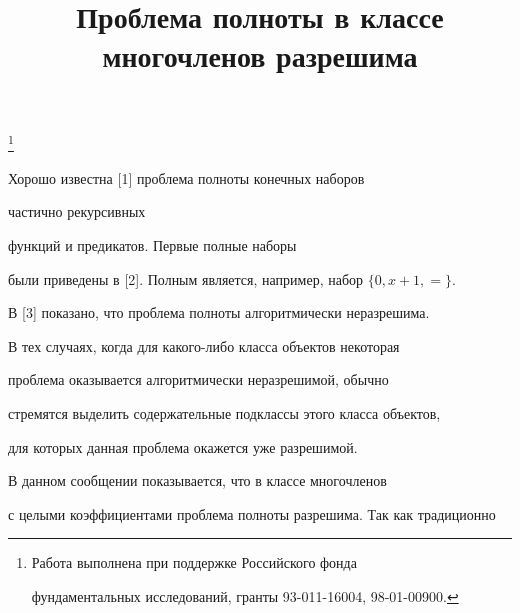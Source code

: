 \title{Проблема полноты в классе многочленов разрешима} 


 


\thanks{Работа выполнена при поддержке Российского фонда 


фундаментальных исследований, гранты 93-011-16004, 98-01-00900.} 


\date{} 




 


\pagestyle{plain} %


 


 




 


\maketitle 


\label{begin} 


 


 


Хорошо известна [1] проблема полноты конечных наборов 


частично рекурсивных 


функций и предикатов. Первые полные наборы 


были приведены в [2]. Полным является, например, набор $\{0,x+1,=\}$. 


В [3] показано, что проблема полноты алгоритмически неразрешима. 


 


В тех случаях, когда для какого-либо класса объектов некоторая 


проблема оказывается алгоритмически неразрешимой, обычно 


стремятся выделить содержательные подклассы этого класса объектов, 


для которых данная проблема окажется уже разрешимой. 


 


В данном сообщении показывается, что в классе многочленов 


с целыми коэффициентами проблема полноты разрешима. Так как традиционно 



